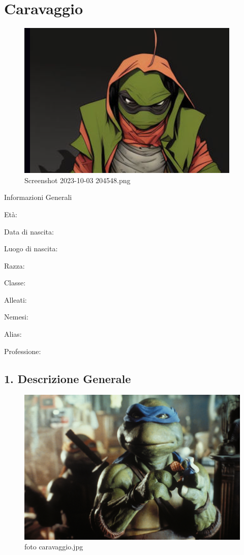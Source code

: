 \section{Caravaggio}\label{caravaggio}


\begin{figure}
\centering
\includegraphics{Screenshot_2023-10-03_204548.png}
\caption{Screenshot 2023-10-03 204548.png}
\end{figure}

Informazioni Generali

Età:

Data di nascita:

Luogo di nascita:

Razza:

Classe:

Alleati:

Nemesi:

Alias:

Professione:


\subsection{1. Descrizione Generale}\label{descrizione-generale}


\begin{figure}
\centering
\includegraphics{foto_caravaggio.jpg}
\caption{foto caravaggio.jpg}
\end{figure}

